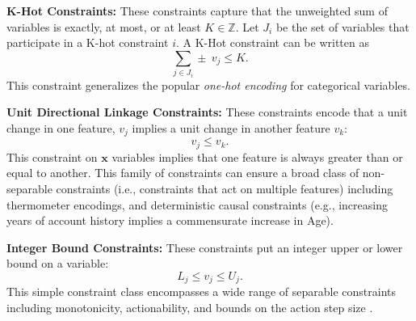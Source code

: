 \textbf{K-Hot Constraints:} These constraints capture that the unweighted sum of variables is exactly, at most, or at least $K \in \mathbb{Z}$. Let $J_i$ be the set of variables that participate in a K-hot constraint $i$. A K-Hot constraint can be written as
$$
\sum_{j \in J_i}  \pm~v_j \leq K.
$$
This constraint generalizes the popular \emph{one-hot encoding} for categorical variables.

\textbf{Unit Directional Linkage Constraints:} These constraints encode that a unit change in one feature, $v_{j}$ implies a unit change in another feature $v_{k}$: 
$$
v_{j} \leq v_{k}.
$$
This constraint on $\mathbf{x}$ variables implies that one feature is always greater than or equal to another.
This family of constraints can ensure a broad class of non-separable constraints (i.e., constraints that act on multiple features) including thermometer encodings, and deterministic causal constraints (e.g., increasing years of account history implies a commensurate increase in Age). 

\textbf{Integer Bound Constraints:} These constraints put an integer upper or lower bound on a variable:
$$
L_j \leq  v_j \leq U_j.
$$
This simple constraint class encompasses a wide range of separable constraints including monotonicity, actionability, and bounds on the action step size \cite{kothari2023prediction}.
